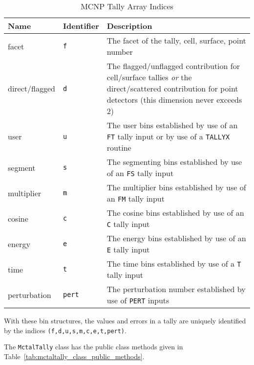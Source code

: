 \documentclass[11pt]{article}
\begin{document}
\begin{table}[]
  \begin{center}
  \caption{MCNP Tally Array Indices}
  \label{tab:mcnp_tally_array_indices}
    \begin{tabular}{llp{4in}}
      \toprule
        Name & Identifier & Description \\
      \midrule
        facet          &  \texttt{f}    & The facet of the tally, cell, surface, point number \\
        direct/flagged &  \texttt{d}    & The flagged/unflagged contribution for cell/surface tallies \emph{or} the direct/scattered contribution for point detectors (this dimension never exceeds 2) \\
        user           &  \texttt{u}    & The user bins established by use of an \texttt{FT} tally input or by use of a \texttt{TALLYX} routine \\
        segment        &  \texttt{s}    & The segmenting bins established by use of an \texttt{FS} tally input \\
        multiplier     &  \texttt{m}    & The multiplier bins established by use of an \texttt{FM} tally input \\
        cosine         &  \texttt{c}    & The cosine bins established by use of an \texttt{C} tally input \\
        energy         &  \texttt{e}    & The energy bins established by use of an \texttt{E} tally input \\
        time           &  \texttt{t}    & The time bins established by use of a \texttt{T} tally input \\
        perturbation   &  \texttt{pert} & The perturbation number established by use of \texttt{PERT} inputs \\
      \bottomrule
    \end{tabular}
  \end{center}
\end{table}

With these bin structures, the values and errors in a tally are uniquely
identified by the indices \texttt{(f,d,u,s,m,c,e,t,pert)}.

The \texttt{MctalTally} class has the public class methods given in
Table~\ref{tab:mctaltally_class_public_methods}.
\end{document}
